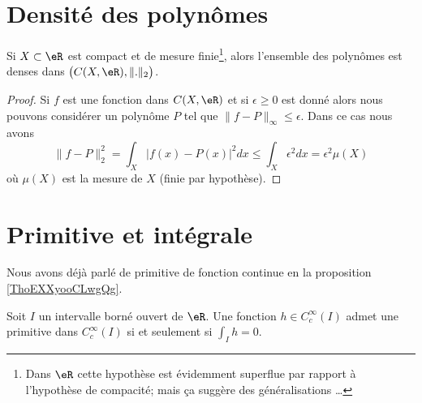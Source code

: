 
\section{Densité des polynômes}

\begin{corollary}   \label{CorRSczQD}
    Si \( X\subset \eR\) est compact et de mesure finie\footnote{Dans \( \eR\) cette hypothèse est évidemment superflue par rapport à l'hypothèse de compacité; mais ça suggère des généralisations \ldots}, alors l'ensemble des polynômes est denses dans \( \big( C(X,\eR),\| . \|_2 \big)\).
\end{corollary}

\begin{proof}
    Si \( f\) est une fonction dans \( C(X,\eR)\) et si \( \epsilon\geq 0\) est donné alors nous pouvons considérer un polynôme \( P\) tel que \( \| f-P \|_{\infty}\leq \epsilon\). Dans ce cas nous avons
    \begin{equation}
        \| f-P \|_2^2=\int_X| f(x)-P(x) |^2dx\leq \int_X\epsilon^2dx=\epsilon^2\mu(X)
    \end{equation}
    où \( \mu(X)\) est la mesure de \( X\) (finie par hypothèse).
\end{proof}

\section{Primitive et intégrale}

Nous avons déjà parlé de primitive de fonction continue en la proposition \ref{ThoEXXyooCLwgQg}.

\begin{proposition} \label{PropHFWNpRb}
    Soit \( I \) un intervalle borné ouvert de \( \eR\). Une fonction \( h\in C^{\infty}_c(I)\) admet une primitive dans \(  C^{\infty}_c(I)\) si et seulement si \( \int_Ih=0\).
\end{proposition}


